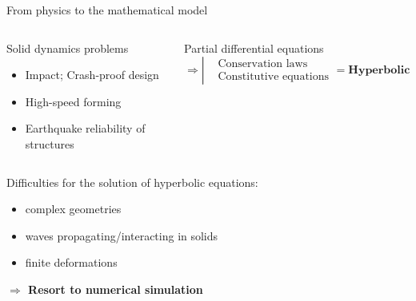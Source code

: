 \begin{frame}{From physics to the mathematical model}
\begin{overprint}
    \begin{columns}
      \begin{column}{0.45\textwidth}
        \begin{block}{Solid dynamics problems}
          \begin{itemize}
          \item[] Impact; Crash-proof design
          \item[] High-speed forming
          \item[] Earthquake reliability of structures 
          \end{itemize}
        \end{block}
      \end{column}
      
      \begin{column}{0.55\textwidth}
        \begin{block}{Partial differential equations}
          \begin{equation*}
            \Rightarrow \left\lvert
              \begin{aligned}
                & \text{Conservation laws} \\
                & \text{Constitutive equations} 
              \end{aligned}
            \right. = \textbf{Hyperbolic system}
          \end{equation*}
        \end{block}
      \end{column}
    \end{columns}
    
    \begin{block}{Difficulties for the solution of hyperbolic equations:}
      \begin{itemize}
      \item complex geometries
      \item waves propagating/interacting in solids
      \item finite deformations
      \end{itemize}
    \end{block}
    \textbf{$\Rightarrow$ Resort to numerical simulation}
  \end{overprint}
\end{frame}


